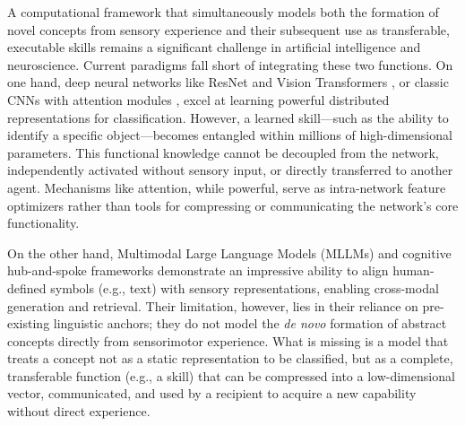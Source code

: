 \documentclass[pdflatex,sn-mathphys-num,lineno]{sn-jnl}%
\begin{document}
\begin{CJK}{UTF8}{gbsn}
A computational framework that simultaneously models both the formation of novel concepts from sensory experience and their subsequent use as transferable, executable skills remains a significant challenge in artificial intelligence and neuroscience. Current paradigms fall short of integrating these two functions. On one hand, deep neural networks like ResNet and Vision Transformers \cite{he_deep_2016,dosovitskiy_image_2021}, or classic CNNs with attention modules \cite{hu_squeeze-and-excitation_2018,woo_cbam_2018}, excel at learning powerful distributed representations for classification. However, a learned skill—such as the ability to identify a specific object—becomes entangled within millions of high-dimensional parameters. This functional knowledge cannot be decoupled from the network, independently activated without sensory input, or directly transferred to another agent. Mechanisms like attention, while powerful, serve as intra-network feature optimizers rather than tools for compressing or communicating the network's core functionality.

On the other hand, Multimodal Large Language Models (MLLMs) \cite{radford_learning_2021,li_blip-2_2023,wu_deepseek-vl2_2024} and cognitive hub-and-spoke frameworks \cite{ralph_neural_2017,jackson_reverse-engineering_2021} demonstrate an impressive ability to align human-defined symbols (e.g., text) with sensory representations, enabling cross-modal generation and retrieval. Their limitation, however, lies in their reliance on pre-existing linguistic anchors; they do not model the \textit{de novo} formation of abstract concepts directly from sensorimotor experience. What is missing is a model that treats a concept not as a static representation to be classified, but as a complete, transferable function (e.g., a skill) that can be compressed into a low-dimensional vector, communicated, and used by a recipient to acquire a new capability without direct experience.


\end{CJK}
\end{document}

